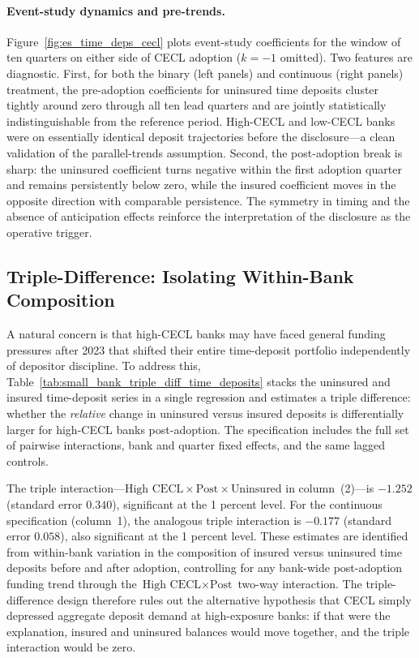 \paragraph{Event-study dynamics and pre-trends.}
Figure~\ref{fig:es_time_deps_cecl} plots event-study coefficients for the
window of ten quarters on either side of CECL adoption ($k = -1$ omitted).
Two features are diagnostic. First, for both the binary (left panels) and
continuous (right panels) treatment, the pre-adoption coefficients for uninsured
time deposits cluster tightly around zero through all ten lead quarters and are
jointly statistically indistinguishable from the reference period. High-CECL and
low-CECL banks were on essentially identical deposit trajectories before the
disclosure—a clean validation of the parallel-trends assumption. Second, the
post-adoption break is sharp: the uninsured coefficient turns negative within the
first adoption quarter and remains persistently below zero, while the insured
coefficient moves in the opposite direction with comparable persistence. The
symmetry in timing and the absence of anticipation effects reinforce the
interpretation of the disclosure as the operative trigger.

\subsection{Triple-Difference: Isolating Within-Bank Composition}
\label{sec:results:triple}

A natural concern is that high-CECL banks may have faced general funding
pressures after 2023 that shifted their entire time-deposit portfolio
independently of depositor discipline. To address this, Table~\ref{tab:small_bank_triple_diff_time_deposits}
stacks the uninsured and insured time-deposit series in a single regression and
estimates a triple difference: whether the \textit{relative} change in uninsured
versus insured deposits is differentially larger for high-CECL banks
post-adoption. The specification includes the full set of pairwise interactions,
bank and quarter fixed effects, and the same lagged controls.

The triple interaction---$\text{High CECL} \times \text{Post} \times
\text{Uninsured}$ in column~(2)---is $-1.252$ (standard error $0.340$),
significant at the 1 percent level. For the continuous specification (column~1),
the analogous triple interaction is $-0.177$ (standard error $0.058$), also
significant at the 1 percent level. These estimates are identified from
within-bank variation in the composition of insured versus uninsured time
deposits before and after adoption, controlling for any bank-wide post-adoption
funding trend through the $\text{High CECL} \times \text{Post}$ two-way
interaction. The triple-difference design therefore rules out the alternative
hypothesis that CECL simply depressed aggregate deposit demand at high-exposure
banks: if that were the explanation, insured and uninsured balances would move
together, and the triple interaction would be zero.

